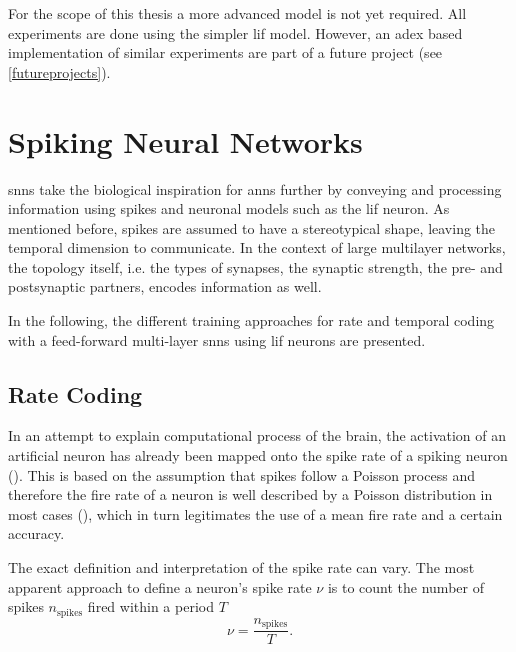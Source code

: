 For the scope of this thesis a more advanced model is not yet required. All experiments are done using the simpler \gls{lif} model. However, an \gls{adex} based implementation of similar experiments are part of a future project (see \cref{futureprojects}).

\section{Spiking Neural Networks}
\label{neuralcoding}

\Glspl{snn} take the biological inspiration for \glspl{ann} further by conveying and processing information using spikes and neuronal models such as the \gls{lif} neuron. As mentioned before, spikes are assumed to have a stereotypical shape, leaving the temporal dimension to communicate. In the context of large multilayer networks, the topology itself, i.e. the types of synapses, the synaptic strength, the pre- and postsynaptic partners, encodes information as well.

In the following, the different training approaches for rate and temporal coding with a feed-forward multi-layer \glspl{snn} using \gls{lif} neurons are presented.

\subsection{Rate Coding}
\label{ratecoding}
In an attempt to explain computational process of the brain, the activation of an artificial neuron has already been mapped onto the spike rate of a spiking neuron (\citealp{rieke1999spikes}). This is based on the assumption that spikes follow a Poisson process and therefore the fire rate of a neuron is well described by a Poisson distribution in most cases (\citealp{averbeck2009poisson}), which in turn legitimates the use of a mean fire rate and a certain accuracy.

The exact definition and interpretation of the spike rate can vary. The most apparent approach to define a neuron's spike rate $\nu$ is to count the number of spikes $n_\text{spikes}$ fired within a period $T$
\begin{equation*}
\nu = \frac{n_\text{spikes}}{T}.
\label{eqratecoding}
\end{equation*}

